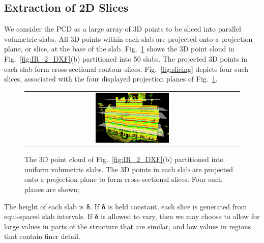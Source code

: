 \documentclass[10pt,journal,cspaper,compsoc]{IEEEtran}
\newcommand{\Fig}[1]{Fig.~\ref{fig:#1}}
\newcommand{\Figb}[1]{Fig.~\ref{fig:#1}(b)}
\begin{document}
\subsection{Extraction of 2D Slices}
\label{sec:image_slicing}

We consider the PCD as a large array of 3D points to be
sliced into parallel volumetric slabs.
All 3D points within each slab are projected onto a projection plane, or slice,
at the base of the slab.
\Fig{slice_slab} shows the 3D point cloud in \Figb{IR_2_DXF} partitioned into
50 slabs.
The projected 3D points in each slab form cross-sectional contour slices.
\Fig{slicing} depicts four such slices, associated with the four displayed
projection planes of \Fig{slice_slab}.

\begin{figure} [htbp]
\begin{center}
\begin{tabular}{c}
\includegraphics[width=0.35\textwidth]{slab_planar.png} 
\end{tabular}
\end{center}
\caption{The 3D point cloud of \Figb{IR_2_DXF} partitioned into uniform
volumetric slabs.
The 3D points in each slab are projected onto a projection plane to
form cross-sectional slices. Four such planes are shown;
}
\label{fig:slice_slab}
\end{figure}

The height of each slab is $\boldsymbol{\delta}$.
If $\boldsymbol{\delta}$ is held constant, each slice is generated from
equi-spaced slab intervals.
If $\boldsymbol{\delta}$ is allowed to vary, then we may
choose to allow for large values in parts of the structure that are similar,
and low values in regions that contain finer detail.
\end{document}
